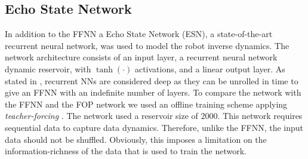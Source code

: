 \subsection{Echo State Network}
In addition to the FFNN a Echo State Network (ESN), a state-of-the-art recurrent neural network, was used to model the robot inverse dynamics. The network architecture consists of an input layer, a recurrent neural network dynamic reservoir, with $\tanh(\cdot)$ activations, and a linear output layer. As stated in \cite{PolydorosNalKru2015}, recurrent NNs are considered deep as they can be unrolled in time to give an FFNN with an indefinite number of layers. To compare the network with the FFNN and the FOP network we used an offline training scheme applying \emph{teacher-forcing} \cite{Lukosevicius2012}. The network used a reservoir size of $2000$. This network requires sequential data to capture data dynamics. Therefore, unlike the FFNN, the input data should not be shuffled. Obviously, this imposes a limitation on the information-richness of the data that is used to train the network.
